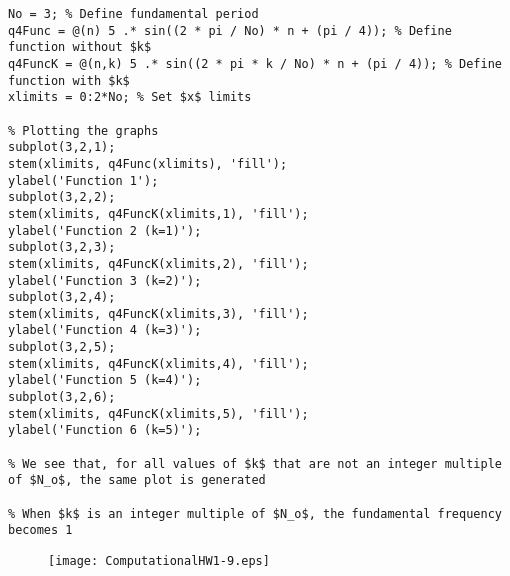 \documentclass[10pt]{article}
\begin{document}
\begin{lstlisting}
No = 3; % Define fundamental period
q4Func = @(n) 5 .* sin((2 * pi / No) * n + (pi / 4)); % Define function without $k$
q4FuncK = @(n,k) 5 .* sin((2 * pi * k / No) * n + (pi / 4)); % Define function with $k$
xlimits = 0:2*No; % Set $x$ limits

% Plotting the graphs
subplot(3,2,1);
stem(xlimits, q4Func(xlimits), 'fill');
ylabel('Function 1');
subplot(3,2,2);
stem(xlimits, q4FuncK(xlimits,1), 'fill');
ylabel('Function 2 (k=1)');
subplot(3,2,3);
stem(xlimits, q4FuncK(xlimits,2), 'fill');
ylabel('Function 3 (k=2)');
subplot(3,2,4);
stem(xlimits, q4FuncK(xlimits,3), 'fill');
ylabel('Function 4 (k=3)');
subplot(3,2,5);
stem(xlimits, q4FuncK(xlimits,4), 'fill');
ylabel('Function 5 (k=4)');
subplot(3,2,6);
stem(xlimits, q4FuncK(xlimits,5), 'fill');
ylabel('Function 6 (k=5)');

% We see that, for all values of $k$ that are not an integer multiple of $N_o$, the same plot is generated

% When $k$ is an integer multiple of $N_o$, the fundamental frequency becomes 1
\end{lstlisting}
\begin{figure}[H]
\texttt{[image: ComputationalHW1-9.eps]}
\end{figure}
\end{document}
